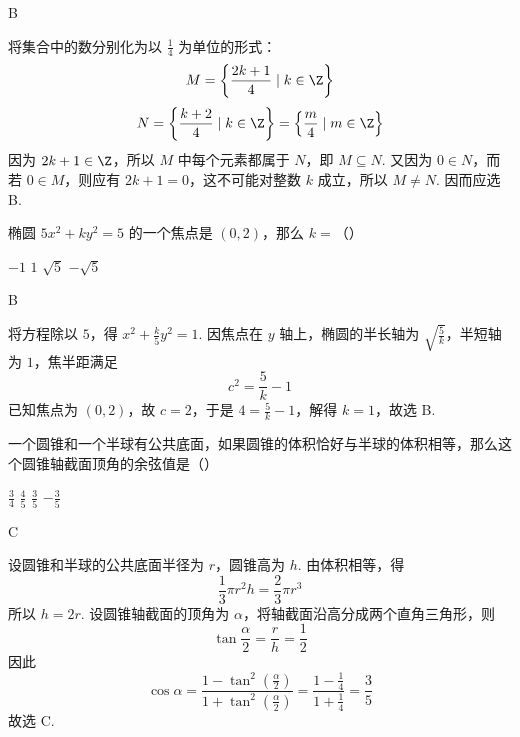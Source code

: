 \begin{answer}
B
\end{answer}

\begin{solution}
将集合中的数分别化为以 \(\frac14\) 为单位的形式：
\[
M=\left\{\frac{2k+1}{4}\mid k\in\Z\right\}
\]
\[
N=\left\{\frac{k+2}{4}\mid k\in\Z\right\}=\left\{\frac{m}{4}\mid m\in\Z\right\}
\]
因为 \(2k+1\in\Z\)，所以 \(M\) 中每个元素都属于 \(N\)，即 \(M\subseteq N\). 又因为 \(0\in N\)，而若 \(0\in M\)，则应有 \(2k+1=0\)，这不可能对整数 \(k\) 成立，所以 \(M\ne N\). 因而应选 B.
\end{solution}

\begin{problem}
椭圆 \(5x^{2} + ky^{2} = 5\) 的一个焦点是 \((0,2)\)，那么 \(k =\)（\quad）

\choices
    {\(-1\)}
    {\(1\)}
    {\(\sqrt{5}\)}
    {\(-\sqrt{5}\)}
\end{problem}

\begin{answer}
B
\end{answer}

\begin{solution}
将方程除以 \(5\)，得 \(x^{2}+\frac{k}{5}y^{2}=1\). 因焦点在 \(y\) 轴上，椭圆的半长轴为 \(\sqrt{\frac{5}{k}}\)，半短轴为 \(1\)，焦半距满足
\[
c^{2}=\frac{5}{k}-1
\]
已知焦点为 \((0,2)\)，故 \(c=2\)，于是 \(4=\frac{5}{k}-1\)，解得 \(k=1\)，故选 B.
\end{solution}

\begin{problem}
一个圆锥和一个半球有公共底面，如果圆锥的体积恰好与半球的体积相等，那么这个圆锥轴截面顶角的余弦值是（\quad）

\choices
    {\(\frac{3}{4}\)}
    {\(\frac{4}{5}\)}
    {\(\frac{3}{5}\)}
    {\(-\frac{3}{5}\)}
\end{problem}

\begin{answer}
C
\end{answer}

\begin{solution}
设圆锥和半球的公共底面半径为 \(r\)，圆锥高为 \(h\). 由体积相等，得
\[
\frac{1}{3}\pi r^{2}h=\frac{2}{3}\pi r^{3}
\]
所以 \(h=2r\). 设圆锥轴截面的顶角为 \(\alpha\)，将轴截面沿高分成两个直角三角形，则
\[
\tan\frac{\alpha}{2}=\frac{r}{h}=\frac12
\]
因此
\[
\cos\alpha=\frac{1-\tan^{2}(\frac{\alpha}{2})}{1+\tan^{2}(\frac{\alpha}{2})}=\frac{1-\frac{1}{4}}{1+\frac{1}{4}}=\frac35
\]
故选 C.
\end{solution}

